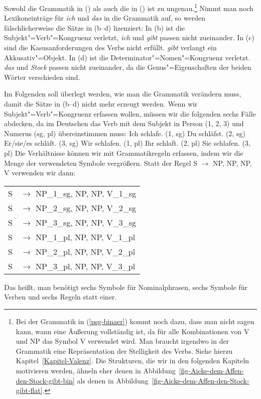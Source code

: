 Sowohl die Grammatik in () als auch die in () ist zu ungenau.\footnote{
  Bei der Grammatik in (\ref{psg-binaer}) kommt noch dazu, dass man nicht sagen kann,
  wann eine Äußerung vollständig ist, da für alle Kombinationen von V und NP das Symbol
  V verwendet wird. Man braucht irgendwo in der Grammatik eine Repräsentation der Stelligkeit
  des Verbs. Siehe hierzu Kapitel~\ref{Kapitel-Valenz}. Die Strukturen, die wir in den folgenden
  Kapiteln motivieren werden, ähneln eher denen in Abbildung~\ref{fig-Aicke-dem-Affen-den-Stock-gibt-bin} als denen in Abbildung~\ref{fig-Aicke-dem-Affen-den-Stock-gibt-flat}.%
}
Nimmt man noch Lexikoneinträge für \emph{ich} und \emph{das} in die Grammatik auf, so werden
fälschlicherweise die Sätze in (b--d) lizenziert:
\eal
{}
\zl
In (b) ist die Subjekt"=Verb"=Kongruenz verletzt, \emph{ich} und \emph{gibt} passen
nicht zueinander. In (c) sind die Kasusanforderungen des Verbs nicht erfüllt.
\emph{gibt} verlangt ein Akkusativ"=Objekt. In (d) ist die Determinator"=Nomen"=Kongruenz
verletzt. \emph{das} und \emph{Stock} passen nicht zueinander, da die Genus"=Eigenschaften der
beiden Wörter verschieden sind.

Im Folgenden soll überlegt werden, wie man die Grammatik verändern muss, damit die Sätze in (b--d)
nicht mehr erzeugt werden. Wenn wir Subjekt"=Verb"=Kongruenz erfassen wollen, müssen
wir die folgenden sechs Fälle abdecken, da im Deutschen das Verb mit dem Subjekt in Person (1, 2, 3)
und Numerus (sg, pl) übereinstimmen muss:
\eal\jamwidth=8cm\relax
\ex Ich schlafe.  \jam(1, sg)
\ex Du schläfst.  \jam(2, sg)
\ex Er/sie/es schläft.   \jam(3, sg)
\ex Wir schlafen. \jam(1, pl)
\ex Ihr schlaft.  \jam(2, pl)
\ex Sie schlafen. \jam(3, pl)
\zl
Die Verhältnisse können wir mit Grammatikregeln erfassen, indem wir die Menge der verwendeten
Symbole vergrößern. Statt der Regel S $\to$ NP, NP, NP, V verwenden wir dann:
\ea
\begin{tabular}[t]{@{}l@{ }l}
S  & $\to$ NP\_1\_sg, NP, NP, V\_1\_sg\\
S  & $\to$ NP\_2\_sg, NP, NP, V\_2\_sg\\
S  & $\to$ NP\_3\_sg, NP, NP, V\_3\_sg\\
S  & $\to$ NP\_1\_pl, NP, NP, V\_1\_pl\\
S  & $\to$ NP\_2\_pl, NP, NP, V\_2\_pl\\
S  & $\to$ NP\_3\_pl, NP, NP, V\_3\_pl\\
\end{tabular}
\z
Das heißt, man benötigt sechs Symbole für Nominalphrasen, sechs Symbole für Verben und 
sechs Regeln statt einer.

